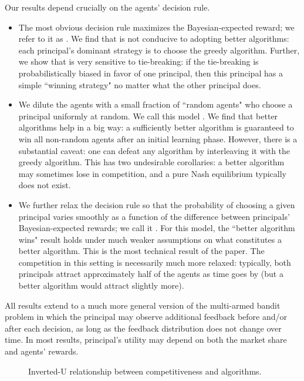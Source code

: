 Our results depend crucially on the agents' decision rule.
\begin{itemize}

\item The most obvious decision rule maximizes the Bayesian-expected reward; we refer to it as \HardMax. We find that \HardMax is not conducive to adopting better algorithms: each principal's dominant strategy is to choose the greedy algorithm. Further, we show that \HardMax is very sensitive to tie-breaking: if the tie-breaking is probabilistically biased in favor of one principal, then this principal has a simple ``winning strategy" no matter what the other principal does.

\item We dilute the \HardMax agents with a small fraction of ``random agents" who choose a principal uniformly at random. We call this model \HardMaxRandom. We find that better algorithms help in a big way: a sufficiently better algorithm is guaranteed to win all non-random agents after an initial learning phase. However, there is a substantial caveat: one can defeat any algorithm by interleaving it with the greedy algorithm. This has two undesirable corollaries: a better algorithm may sometimes lose in competition, and a pure Nash equilibrium typically does not exist.

\item We further relax the decision rule so that the probability of choosing a given principal varies smoothly as a function of the difference between  principals' Bayesian-expected rewards; we call it \SoftMaxRandom. For this model, the ``better algorithm wins" result holds under much weaker assumptions on what constitutes a better algorithm. This is the most technical result of the paper. The competition in this setting is necessarily much more relaxed: typically, both principals attract approximately half of the agents as time goes by (but a better algorithm would attract slightly more).
\end{itemize}

All results extend to a much more general version of the multi-armed bandit problem in which the principal may observe additional feedback before and/or after each decision, as long as the feedback distribution does not change over time. In most results, principal's utility may depend on both the market share and agents' rewards.

\begin{figure}
\begin{center}

\caption{Inverted-U relationship between competitiveness and algorithms.}
\label{fig:inverted-U}
\end{center}
\end{figure}


